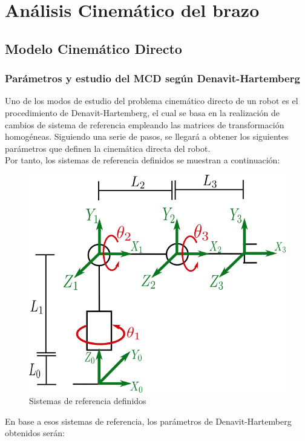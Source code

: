 \section{Análisis Cinemático del brazo}

\subsection{Modelo Cinemático Directo}

\subsubsection{Parámetros y estudio del MCD según Denavit-Hartemberg}

Uno de los modos de estudio del problema cinemático directo de un robot es el procedimiento de Denavit-Hartemberg, el cual se basa en la realización de cambios de sistema de referencia empleando las matrices de transformación homogéneas. Siguiendo una serie de pasos, se llegará a obtener los siguientes parámetros que definen la cinemática directa del robot.\\

Por tanto, los sistemas de referencia definidos se muestran a continuación:




\begin{figure}[h!]
	
	\centering
	
	\includegraphics[width=.5\textwidth]{ejes_DH}
	
	\caption{Sistemas de referencia definidos}
	
\end{figure}



En base a esos sistemas de referencia, los parámetros de Denavit-Hartemberg obtenidos serán:

